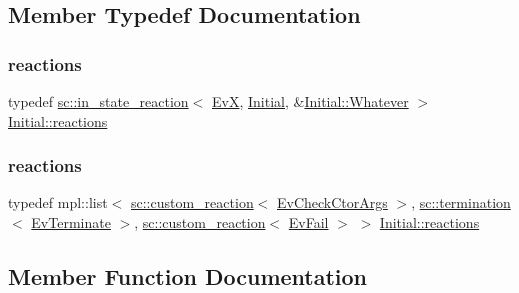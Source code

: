 \subsection{Member Typedef Documentation}
\mbox{\label{struct_initial_ae59c180b2502baea61d37fde8fbc2f3f}} 
\subsubsection{\texorpdfstring{reactions}{reactions}\hspace{0.1cm}{\footnotesize\ttfamily [1/2]}}
{\footnotesize\ttfamily typedef \mbox{\hyperlink{classboost_1_1statechart_1_1in__state__reaction}{sc\+::in\+\_\+state\+\_\+reaction}}$<$ \mbox{\hyperlink{struct_ev_x}{EvX}}, \mbox{\hyperlink{struct_initial}{Initial}}, \&\mbox{\hyperlink{struct_initial_a90852b531c8b25d4f321fc5b37fa86a9}{Initial\+::\+Whatever}} $>$ \mbox{\hyperlink{struct_initial_a4f92c6c4abdfc993dc9b0f20bab71522}{Initial\+::reactions}}}

\mbox{\label{struct_initial_a4f92c6c4abdfc993dc9b0f20bab71522}} 
\subsubsection{\texorpdfstring{reactions}{reactions}\hspace{0.1cm}{\footnotesize\ttfamily [2/2]}}
{\footnotesize\ttfamily typedef mpl\+::list$<$ \mbox{\hyperlink{classboost_1_1statechart_1_1custom__reaction}{sc\+::custom\+\_\+reaction}}$<$ \mbox{\hyperlink{struct_ev_check_ctor_args}{Ev\+Check\+Ctor\+Args}} $>$, \mbox{\hyperlink{classboost_1_1statechart_1_1termination}{sc\+::termination}}$<$ \mbox{\hyperlink{struct_ev_terminate}{Ev\+Terminate}} $>$, \mbox{\hyperlink{classboost_1_1statechart_1_1custom__reaction}{sc\+::custom\+\_\+reaction}}$<$ \mbox{\hyperlink{struct_ev_fail}{Ev\+Fail}} $>$ $>$ \mbox{\hyperlink{struct_initial_a4f92c6c4abdfc993dc9b0f20bab71522}{Initial\+::reactions}}}



\subsection{Member Function Documentation}
\mbox{\label{struct_initial_a9a8f94a14d12fff4485db1360ee999ff}} 
